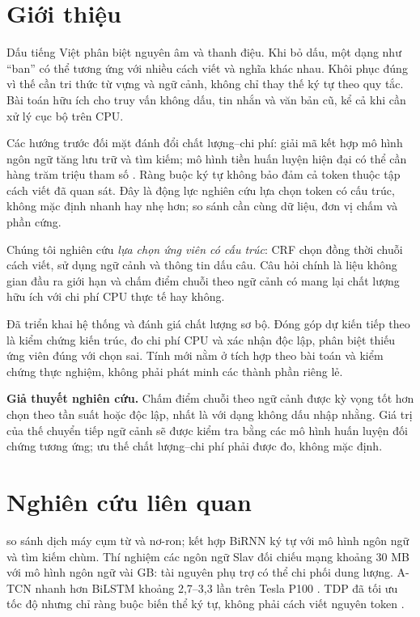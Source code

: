\documentclass{article}
\begin{document}
\section{Giới thiệu}
Dấu tiếng Việt phân biệt nguyên âm và thanh điệu. Khi bỏ dấu, một dạng như ``ban'' có thể tương ứng với nhiều cách viết và nghĩa khác nhau. Khôi phục đúng vì thế cần tri thức từ vựng và ngữ cảnh, không chỉ thay thế ký tự theo quy tắc. Bài toán hữu ích cho truy vấn không dấu, tin nhắn và văn bản cũ, kể cả khi cần xử lý cục bộ trên CPU.

Các hướng trước đối mặt đánh đổi chất lượng--chi phí: giải mã kết hợp mô hình ngôn ngữ tăng lưu trữ và tìm kiếm; mô hình tiền huấn luyện hiện đại có thể cần hàng trăm triệu tham số \citep{naplava2018,nom2026}. Ràng buộc ký tự không bảo đảm cả token thuộc tập cách viết đã quan sát. Đây là động lực nghiên cứu lựa chọn token có cấu trúc, không mặc định nhanh hay nhẹ hơn; so sánh cần cùng dữ liệu, đơn vị chấm và phần cứng.

Chúng tôi nghiên cứu \emph{lựa chọn ứng viên có cấu trúc}: CRF chọn đồng thời chuỗi cách viết, sử dụng ngữ cảnh và thông tin dấu câu. Câu hỏi chính là liệu không gian đầu ra giới hạn và chấm điểm chuỗi theo ngữ cảnh có mang lại chất lượng hữu ích với chi phí CPU thực tế hay không.

Đã triển khai hệ thống và đánh giá chất lượng sơ bộ. Đóng góp dự kiến tiếp theo là kiểm chứng kiến trúc, đo chi phí CPU và xác nhận độc lập, phân biệt thiếu ứng viên đúng với chọn sai. Tính mới nằm ở tích hợp theo bài toán và kiểm chứng thực nghiệm, không phải phát minh các thành phần riêng lẻ.

\textbf{Giả thuyết nghiên cứu.} Chấm điểm chuỗi theo ngữ cảnh được kỳ vọng tốt hơn chọn theo tần suất hoặc độc lập, nhất là với dạng không dấu nhập nhằng. Giá trị của thế chuyển tiếp ngữ cảnh sẽ được kiểm tra bằng các mô hình huấn luyện đối chứng tương ứng; ưu thế chất lượng--chi phí phải được đo, không mặc định.

\section{Nghiên cứu liên quan}
\citet{pham2017} so sánh dịch máy cụm từ và nơ-ron; \citet{naplava2018} kết hợp BiRNN ký tự với mô hình ngôn ngữ và tìm kiếm chùm. Thí nghiệm các ngôn ngữ Slav đối chiếu mạng khoảng 30 MB với mô hình ngôn ngữ vài GB: tài nguyên phụ trợ có thể chi phối dung lượng. A-TCN nhanh hơn BiLSTM khoảng 2,7--3,3 lần trên Tesla P100 \citep{alqahtani2019}. TDP đã tối ưu tốc độ nhưng chỉ ràng buộc biến thể ký tự, không phải cách viết nguyên token \citep{dang2020}.
\end{document}
